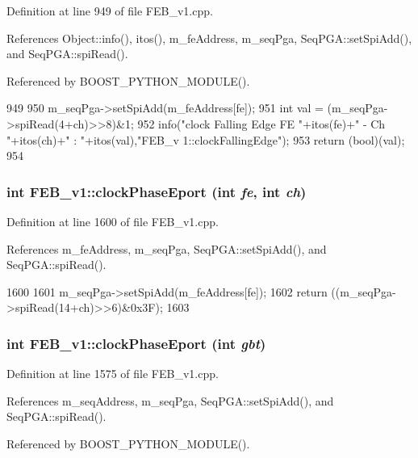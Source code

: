Definition at line 949 of file FEB\_\-v1.cpp.

References Object::info(), itos(), m\_\-feAddress, m\_\-seqPga, SeqPGA::setSpiAdd(), and SeqPGA::spiRead().

Referenced by BOOST\_\-PYTHON\_\-MODULE().


\begin{DoxyCode}
949                                               {
950   m_seqPga->setSpiAdd(m_feAddress[fe]);
951   int val = (m_seqPga->spiRead(4+ch)>>8)&1;
952   info("clock Falling Edge FE "+itos(fe)+" - Ch "+itos(ch)+" : "+itos(val),"FEB_v
      1::clockFallingEdge");
953   return (bool)(val);
954 }
\end{DoxyCode}
\hypertarget{classFEB__v1_aab32d0b274dfb55f1c2894ff3d08eaba}{
\subsubsection[{clockPhaseEport}]{\setlength{\rightskip}{0pt plus 5cm}int FEB\_\-v1::clockPhaseEport (int {\em fe}, \/  int {\em ch})}}
\label{classFEB__v1_aab32d0b274dfb55f1c2894ff3d08eaba}


Definition at line 1600 of file FEB\_\-v1.cpp.

References m\_\-feAddress, m\_\-seqPga, SeqPGA::setSpiAdd(), and SeqPGA::spiRead().


\begin{DoxyCode}
1600                                           {
1601   m_seqPga->setSpiAdd(m_feAddress[fe]);
1602   return ((m_seqPga->spiRead(14+ch)>>6)&0x3F);
1603 }
\end{DoxyCode}
\hypertarget{classFEB__v1_a4a5b20275b96a19eba0c28d694c88ca8}{
\subsubsection[{clockPhaseEport}]{\setlength{\rightskip}{0pt plus 5cm}int FEB\_\-v1::clockPhaseEport (int {\em gbt})}}
\label{classFEB__v1_a4a5b20275b96a19eba0c28d694c88ca8}


Definition at line 1575 of file FEB\_\-v1.cpp.

References m\_\-seqAddress, m\_\-seqPga, SeqPGA::setSpiAdd(), and SeqPGA::spiRead().

Referenced by BOOST\_\-PYTHON\_\-MODULE().


